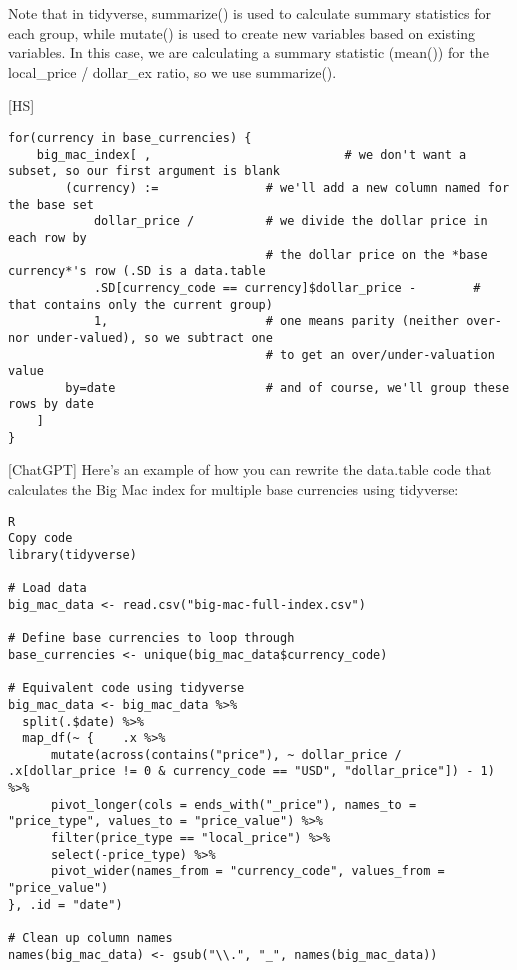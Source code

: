 \documentclass[
]{book}
\theoremstyle{definition}
\theoremstyle{definition}
\theoremstyle{definition}
\theoremstyle{definition}
\theoremstyle{remark}
\begin{document}
Note that in tidyverse, summarize() is used to calculate summary statistics for each group, while mutate() is used to create new variables based on existing variables. In this case, we are calculating a summary statistic (mean()) for the local\_price / dollar\_ex ratio, so we use summarize().

{[}HS{]}

\begin{verbatim}
for(currency in base_currencies) {
    big_mac_index[ ,                           # we don't want a subset, so our first argument is blank
        (currency) :=               # we'll add a new column named for the base set
            dollar_price /          # we divide the dollar price in each row by
                                    # the dollar price on the *base currency*'s row (.SD is a data.table
            .SD[currency_code == currency]$dollar_price -        # that contains only the current group)
            1,                      # one means parity (neither over- nor under-valued), so we subtract one
                                    # to get an over/under-valuation value
        by=date                     # and of course, we'll group these rows by date
    ]
}
\end{verbatim}

{[}ChatGPT{]} Here's an example of how you can rewrite the data.table code that calculates the Big Mac index for multiple base currencies using tidyverse:

\begin{verbatim}
R
Copy code
library(tidyverse)

# Load data
big_mac_data <- read.csv("big-mac-full-index.csv")

# Define base currencies to loop through
base_currencies <- unique(big_mac_data$currency_code)

# Equivalent code using tidyverse
big_mac_data <- big_mac_data %>%
  split(.$date) %>%
  map_df(~ {    .x %>%
      mutate(across(contains("price"), ~ dollar_price / .x[dollar_price != 0 & currency_code == "USD", "dollar_price"]) - 1) %>%
      pivot_longer(cols = ends_with("_price"), names_to = "price_type", values_to = "price_value") %>%
      filter(price_type == "local_price") %>%
      select(-price_type) %>%
      pivot_wider(names_from = "currency_code", values_from = "price_value")
}, .id = "date")

# Clean up column names
names(big_mac_data) <- gsub("\\.", "_", names(big_mac_data))
\end{verbatim}
\end{document}
